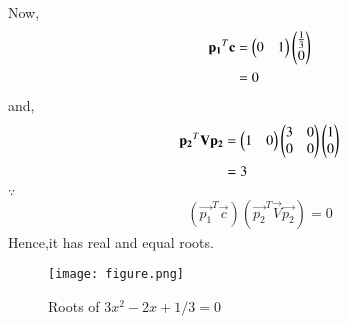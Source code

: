 \documentclass[journal,12pt,twocolumn]{IEEEtran}
\begin{document}
Now,
\begin{align}
\mathbf{p_1}^T\mathbf{c} &= \begin{pmatrix}0 & 1\end{pmatrix}\begin{pmatrix}\frac{1}{3}\\0\end{pmatrix}
\\
&= 0
\end{align}
and,
\begin{align}
\mathbf{p_2}^T\mathbf{V}\mathbf{p_2} &= \begin{pmatrix}1 & 0\end{pmatrix}\begin{pmatrix}3 & 0\\0& 0\end{pmatrix}\begin{pmatrix}1 \\ 0\end{pmatrix}
\\
&= 3
\end{align}
$\because$
\begin{align}
(\vec{p_1}^T\vec{c})(\vec{p_2}^T\vec{V}\vec{p_2}) = 0
\end{align}
Hence,it has real and equal roots.
\begin{figure}[H]
\centering
\texttt{[image: figure.png]}
\caption{Roots of $3x^2 -2x + 1/3 = 0$ }
\label{Roots of $3x^2 -2x+ 1/3 = 0$}
\end{figure}
\end{document}
